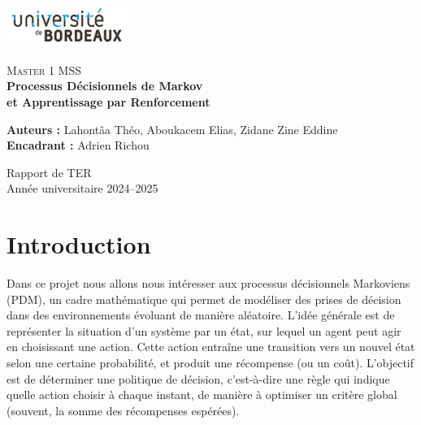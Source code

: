 \documentclass[12pt]{article}
\begin{document}
\begin{titlepage}
    \centering

    \includegraphics[width=4cm]{logo.png}\par\vspace{1cm}

    \textsc{\large Master 1 MSS}\\[1.5cm]

    {\Huge\bfseries Processus Décisionnels de Markov\\[0.3cm]
    et Apprentissage par Renforcement\\[1cm]}

    \vfill

    \begin{flushleft}
        \textbf{Auteurs :} Lahontâa Théo, Aboukacem Elias, Zidane Zine Eddine \\
        \textbf{Encadrant :} Adrien Richou \\
    \end{flushleft}

    \vfill

    \centering
    Rapport de TER\\
    Année universitaire 2024--2025

\end{titlepage}


\tableofcontents
\newpage




\section*{Introduction}

Dans ce projet nous allons nous intéresser aux processus décisionnels Markoviens (PDM), un cadre mathématique qui permet de modéliser des prises de décision dans des environnements évoluant de manière aléatoire. L’idée générale est de représenter la situation d’un système par un état, sur lequel un agent peut agir en choisissant une action. Cette action entraîne une transition vers un nouvel état selon une certaine probabilité, et produit une récompense (ou un coût). L’objectif est de déterminer une politique de décision, c’est-à-dire une règle qui indique quelle action choisir à chaque instant, de manière à optimiser un critère global (souvent, la somme des récompenses espérées).
\end{document}
